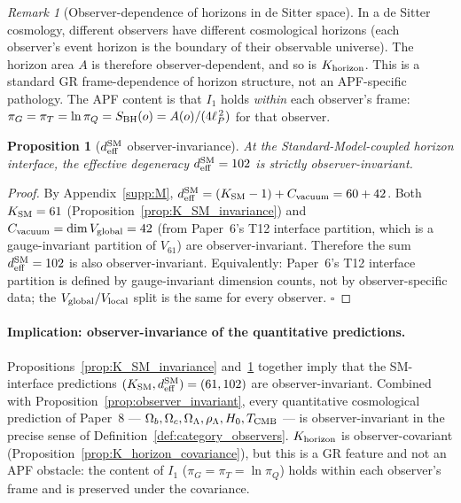 \documentclass[11pt]{article}
\theoremstyle{plain}
\newtheorem{proposition}[theorem]{Proposition}
\theoremstyle{definition}
\theoremstyle{remark}
\newtheorem{remark}[theorem]{Remark}
\begin{document}
\begin{remark}[Observer-dependence of horizons in de Sitter space]\label{rem:dS_observer}
In a de Sitter cosmology, different observers have different cosmological horizons (each observer's event horizon is the boundary of their observable universe).  The horizon area $A$ is therefore observer-dependent, and so is $K_{\rm horizon}$.  This is a standard GR frame-dependence of horizon structure, not an APF-specific pathology.  The APF content is that $I_1$ holds \emph{within} each observer's frame: $\pi_G = \pi_T = \ln \pi_Q = S_{\rm BH}(o) = A(o)/(4\ell_P^{\,2})$ for that observer.
\end{remark}

\begin{proposition}[$d_{\rm eff}^{\rm SM}$ observer-invariance]\label{prop:d_eff_SM_invariance}
At the Standard-Model-coupled horizon interface, the effective degeneracy $d_{\rm eff}^{\rm SM} = 102$ is strictly observer-invariant.
\end{proposition}

\begin{proof}
By Appendix~\ref{supp:M}, $d_{\rm eff}^{\rm SM} = (K_{\rm SM} - 1) + C_{\rm vacuum} = 60 + 42$.  Both $K_{\rm SM} = 61$ (Proposition~\ref{prop:K_SM_invariance}) and $C_{\rm vacuum} = \dim V_{\rm global} = 42$ (from Paper~6's T12 interface partition, which is a gauge-invariant partition of $V_{61}$) are observer-invariant.  Therefore the sum $d_{\rm eff}^{\rm SM} = 102$ is also observer-invariant.  Equivalently: Paper~6's T12 interface partition is defined by gauge-invariant dimension counts, not by observer-specific data; the $V_{\rm global} / V_{\rm local}$ split is the same for every observer.  $\square$
\end{proof}

\paragraph{Implication: observer-invariance of the quantitative predictions.}  Propositions~\ref{prop:K_SM_invariance} and~\ref{prop:d_eff_SM_invariance} together imply that the SM-interface predictions $(K_{\rm SM}, d_{\rm eff}^{\rm SM}) = (61, 102)$ are observer-invariant.  Combined with Proposition~\ref{prop:observer_invariant}, every quantitative cosmological prediction of Paper~8 --- $\Omega_b, \Omega_c, \Omega_\Lambda, \rho_\Lambda, H_0, T_{\rm CMB}$ --- is observer-invariant in the precise sense of Definition~\ref{def:category_observers}.  $K_{\rm horizon}$ is observer-covariant (Proposition~\ref{prop:K_horizon_covariance}), but this is a GR feature and not an APF obstacle: the content of $I_1$ ($\pi_G = \pi_T = \ln \pi_Q$) holds within each observer's frame and is preserved under the covariance.
\end{document}
